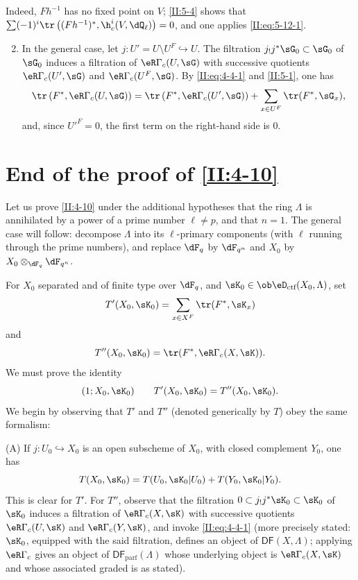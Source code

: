 \documentclass[oneside]{book}
\begin{document}
Indeed, $F h^{-1}$ has no fixed point on $V$; \ref{II:5-4} shows that
$\sum (-1)^i \tr\left((F h^{-1})^*,\h_c^i(V,\dQ_\ell)\right)=0$, and one
applies \eqref{II:eq:5-12-1}.
\begin{enumerate}[\indent A.]
\setcounter{enumi}{1}
  \item In the general case, let $j:U'=U\setminus U^F\hookrightarrow U$.
    The filtration $j_! j^* \sG_0\subset \sG_0$ of $\sG_0$ induces a
    filtration of $\eR\Gamma_c(U,\sG)$ with successive quotients
    $\eR\Gamma_c(U',\sG)$ and $\eR\Gamma_c(U^F,\sG)$. By
    \eqref{II:eq:4-4-1} and \ref{II:5-1}, one has
    \[
      \tr\left(F^*,\eR\Gamma_c(U,\sG)\right) = \tr\left(F^*,\eR\Gamma_c(U',\sG)\right) + \sum_{x\in U^F} \tr(F^*,\sG_x) \text{,}
    \]
    and, since ${U'}^F=0$, the first term on the right-hand side is $0$.
\end{enumerate}











\section{End of the proof of \ref{II:4-10}}\label{II:6}

Let us prove \ref{II:4-10} under the additional hypotheses that the ring
$\Lambda$ is annihilated by a power of a prime number $\ell\ne p$, and that
$n=1$. The general case will follow: decompose $\Lambda$ into its
$\ell$-primary components (with $\ell$ running through the prime numbers),
and replace $\dF_q$ by $\dF_{q^n}$ and $X_0$ by
$X_0\otimes_{\dF_q}\dF_{q^n}$.

For $X_0$ separated and of finite type over $\dF_q$, and
$\sK_0\in\ob\eD_\text{ctf}(X_0,\Lambda)$, set
\[
  T'(X_0,\sK_0) = \sum_{x\in X^F} \tr(F^*,\sK_x)
\]
and
\[
  T''(X_0,\sK_0) = \tr(F^*,\eR\Gamma_c(X,\sK)) \text{.}
\]
We must prove the identity
\[
  (1;X_0,\sK_0) \qquad T'(X_0,\sK_0) = T''(X_0,\sK_0) \text{.}
\]
We begin by observing that $T'$ and $T''$ (denoted generically by $T$) obey
the same formalism:

(A) If $j:U_0\hookrightarrow X_0$ is an open subscheme of $X_0$, with
closed complement $Y_0$, one has
\[
  T(X_0,\sK_0) = T(U_0,\sK_0|U_0) + T(Y_0,\sK_0|Y_0) \text{.}
\]
This is clear for $T'$. For $T''$, observe that the filtration
$0\subset j_! j^* \sK_0\subset \sK_0$ of $\sK_0$ induces a filtration of
$\eR\Gamma_c(X,\sK)$ with successive quotients $\eR\Gamma_c(U,\sK)$ and
$\eR\Gamma_c(Y,\sK)$, and invoke \eqref{II:eq:4-4-1} (more precisely stated:
$\sK_0$, equipped with the said filtration, defines an object of
$\mathsf{DF}(X,\Lambda)$; applying $\eR\Gamma_c$ gives an object of
$\mathsf{DF}_\text{parf}(\Lambda)$ whose underlying object is
$\eR\Gamma_c(X,\sK)$ and whose associated graded is as stated).
\end{document}

